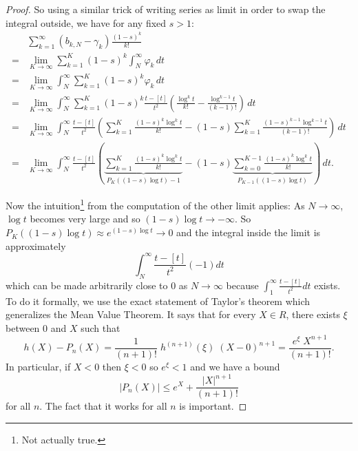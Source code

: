 \documentclass{article}
\begin{document}
\begin{proof}
So using a similar trick of writing series as limit in order to swap the integral outside, we have for any fixed $s > 1$:
\begin{align*}
&\sum_{k=1}^{\infty} \left( b_{k,N} - \gamma_k \right) \frac{(1 - s)^k}{k!}\\
=& \lim_{K \rightarrow \infty} \sum_{k=1}^{K} (1 - s)^k  \int_N^\infty \varphi_k \, dt\\
=& \lim_{K \rightarrow \infty} \int_N^\infty \sum_{k=1}^{K} (1 - s)^k  \varphi_k \, dt\\
=& \lim_{K \rightarrow \infty} \int_N^\infty \sum_{k=1}^{K} (1 - s)^k  \frac{t - [t]}{t^2} \left( \frac{\log^k t}{k!} - \frac{\log^{k-1} t}{(k-1)!} \right) \, dt\\
=& \lim_{K \rightarrow \infty} \int_N^\infty \frac{t - [t]}{t^2} \left(\sum_{k=1}^{K} \frac{(1 - s)^k \log^k t}{k!} - (1 - s) \sum_{k=1}^{K} \frac{(1 - s)^{k-1} \log^{k-1} t}{(k-1)!} \right) \, dt\\
=& \lim_{K \rightarrow \infty} \int_N^\infty \frac{t - [t]}{t^2} \left( \underbrace{\sum_{k=1}^{K} \frac{(1 - s)^k \log^k t}{k!}}_{P_K((1-s)\log t) - 1} - (1 - s) \underbrace{\sum_{k=0}^{K-1} \frac{(1 - s)^{k} \log^k t}{k!}}_{P_{K-1}((1-s)\log t)} \right) \, dt.
\end{align*}

Now the intuition\footnote{Not actually true.} from the computation of the other limit applies: As $N \rightarrow \infty$, $\log t$ becomes very large and so $(1 - s) \log t \rightarrow -\infty$. So $P_K((1-s)\log t) \approx e^{(1-s) \log t} \rightarrow 0$ and the integral inside the limit is approximately
$$\int_N^\infty \frac{t - [t]}{t^2} (-1) dt$$
which can be made arbitrarily close to 0 as $N \rightarrow \infty$ because $\int_1^\infty \frac{t - [t]}{t^2} dt$ exists. To do it formally, we use the exact statement of Taylor's theorem which generalizes the Mean Value Theorem. It says that for every $X \in R$, there exists $\xi$ between 0 and $X$ such that
$$h(X) - P_n(X) = \frac{1}{(n+1)!} \; h^{(n+1)}(\xi) \; (X - 0)^{n+1} = \frac{e^{\xi} \; X^{n+1}}{(n+1)!}.$$
In particular, if $X < 0$ then $\xi < 0$ so $e^\xi < 1$ and we have a bound
$$|P_n(X)| \leq e^X + \frac{|X|^{n+1}}{(n+1)!}$$
for all $n$. The fact that it works for all $n$ is important.


\end{proof}
\end{document}
